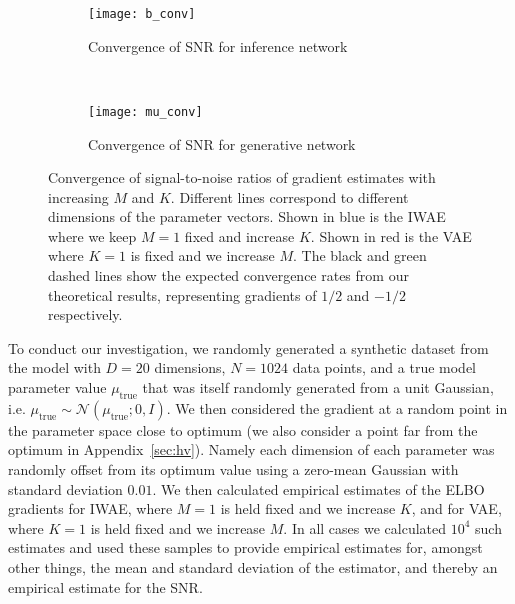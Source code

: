 \begin{figure*}[t]
	\centering
	\begin{subfigure}[b]{0.4\textwidth}
		\centering
		\texttt{[image: b\_conv]}\vspace{-4pt}
		\caption{\vspace{-6pt} Convergence of \gls{SNR} for inference network \label{fig:snr/b}}
	\end{subfigure}
~~~~~~~~~~~~~~
	\begin{subfigure}[b]{0.4\textwidth}
		\centering
		\texttt{[image: mu\_conv]}\vspace{-4pt}
		\caption{\vspace{-6pt} Convergence of \gls{SNR} for generative network\label{fig:snr/mu}}
	\end{subfigure}
	\caption{Convergence of signal-to-noise ratios of gradient estimates with increasing $M$ and $K$.
		Different lines correspond to different
		dimensions of the parameter vectors.
		Shown in blue is the \gls{IWAE} where we keep $M=1$ fixed and increase $K$.  
		Shown in red is the \gls{VAE} where $K=1$ is fixed and we increase $M$. 
		The black and green dashed lines show the expected convergence rates from our theoretical results, 
		representing gradients of $1/2$ and $-1/2$ respectively.  
		\vspace{-12pt}
		\label{fig:snr/K_conv}}
\end{figure*}

To conduct our investigation, we randomly generated a synthetic dataset from the model with $D=20$
dimensions, $N=1024$ data points, and a true model parameter value $\mu_{\text{true}}$ that was itself 
randomly generated from a unit Gaussian, i.e. $\mu_{\text{true}} \sim \mathcal{N}(\mu_{\text{true}} ;0,I)$.
We then considered the gradient at a random point in the parameter space close to optimum (we also 
	consider a point far from the optimum in 
	Appendix~\ref{sec:hv}). Namely
each dimension of each parameter was randomly offset from its optimum value using a zero-mean
Gaussian with standard deviation $0.01$.  We then calculated empirical estimates of the \gls{ELBO}
gradients for \gls{IWAE}, where $M=1$ is held fixed and we increase $K$, and
for \gls{VAE}, where $K=1$ is held fixed and we increase $M$.  In all cases we 
calculated $10^4$ such estimates and used these samples to provide empirical estimates for, amongst other things, the
mean and standard deviation of the estimator, and thereby an empirical estimate for the \gls{SNR}.

